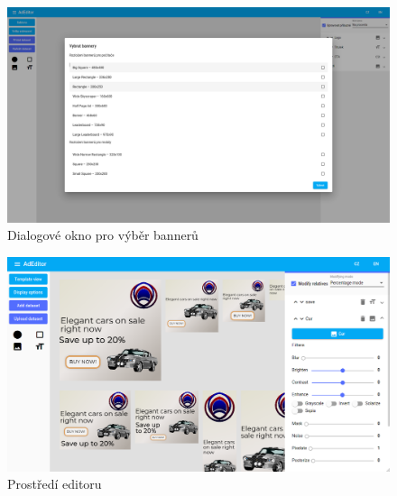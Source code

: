     \begin{figure}[h]
        \includegraphics[width=1.0\textwidth]{Figures/editor/bannery-dialog.png}
        \caption[Výběr bannerů]{Dialogové okno pro výběr bannerů}
        \label{fig:editor:banner-dialog}
    \end{figure}

    \begin{figure}[h]
        \includegraphics[width=1.0\textwidth]{Figures/editor/ad-editor.png}
        \caption{Prostředí editoru}
        \label{fig:editor:editor}
    \end{figure}

